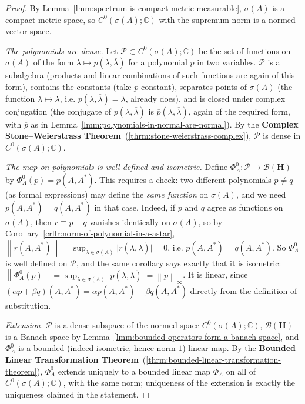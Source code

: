 \begin{proof}
    \leanok
By Lemma~\ref{lmm:spectrum-is-compact-metric-measurable}, $\sigma(A)$ is a compact metric space, so $C^0(\sigma(A);\mathbb{C})$ with the supremum norm is a normed vector space.

\textit{The polynomials are dense.} Let $\mathcal{P} \subset C^0(\sigma(A);\mathbb{C})$ be the set of functions on $\sigma(A)$ of the form $\lambda \mapsto p(\lambda,\overline\lambda)$ for a polynomial $p$ in two variables. $\mathcal{P}$ is a subalgebra (products and linear combinations of such functions are again of this form), contains the constants (take $p$ constant), separates points of $\sigma(A)$ (the function $\lambda\mapsto\lambda$, i.e. $p(\lambda,\overline\lambda)=\lambda$, already does), and is closed under complex conjugation (the conjugate of $p(\lambda,\overline\lambda)$ is $\overline{p}(\lambda,\overline\lambda)$, again of the required form, with $\overline p$ as in Lemma~\ref{lmm:polynomials-in-normal-are-normal}). By the \textbf{Complex Stone–Weierstrass Theorem}~(\ref{thrm:stone-weierstrass-complex}), $\mathcal{P}$ is dense in $C^0(\sigma(A);\mathbb{C})$.

\textit{The map on polynomials is well defined and isometric.} Define $\Phi_A^0 : \mathcal{P} \to \mathcal{B}(\mathbf{H})$ by $\Phi_A^0(p) = p(A,A^*)$. This requires a check: two different polynomials $p \ne q$ (as formal expressions) may define the \textit{same function} on $\sigma(A)$, and we need $p(A,A^*) = q(A,A^*)$ in that case. Indeed, if $p$ and $q$ agree as functions on $\sigma(A)$, then $r \equiv p - q$ vanishes identically on $\sigma(A)$, so by Corollary~\ref{crllr:norm-of-polynomial-in-a-astar}, $\left\| r(A,A^*) \right\| = \sup_{\lambda\in\sigma(A)} \lvert r(\lambda,\overline\lambda) \rvert = 0$, i.e. $p(A,A^*) = q(A,A^*)$. So $\Phi_A^0$ is well defined on $\mathcal{P}$, and the same corollary says exactly that it is isometric: $\left\| \Phi_A^0(p) \right\| = \sup_{\lambda\in\sigma(A)}\lvert p(\lambda,\overline\lambda) \rvert = \left\| p \right\|_\infty$. It is linear, since $(\alpha p + \beta q)(A,A^*) = \alpha p(A,A^*) + \beta q(A,A^*)$ directly from the definition of substitution.

\textit{Extension.} $\mathcal{P}$ is a dense subspace of the normed space $C^0(\sigma(A);\mathbb{C})$, $\mathcal{B}(\mathbf{H})$ is a Banach space by Lemma~\ref{lmm:bounded-operators-form-a-banach-space}, and $\Phi_A^0$ is a bounded (indeed isometric, hence norm-$1$) linear map. By the \textbf{Bounded Linear Transformation Theorem}~(\ref{thrm:bounded-linear-transformation-theorem}), $\Phi_A^0$ extends uniquely to a bounded linear map $\Phi_A$ on all of $C^0(\sigma(A);\mathbb{C})$, with the same norm; uniqueness of the extension is exactly the uniqueness claimed in the statement.


\end{proof}

